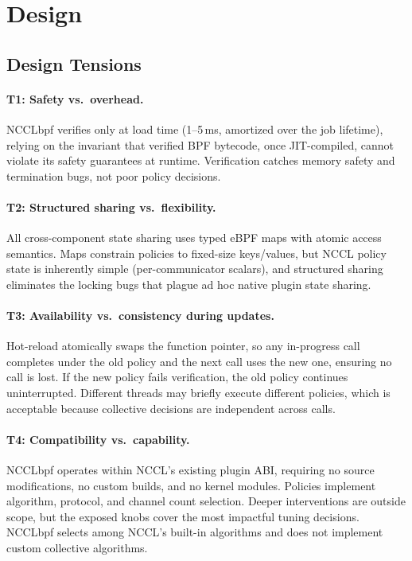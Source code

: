 \documentclass[sigplan,10pt]{acmart}
\newcommand{\sysname}{NCCLbpf\xspace}
\begin{document}
\section{Design}
\label{sec:design}

\subsection{Design Tensions}

\paragraph{T1: Safety vs.\ overhead.}
\sysname verifies only at load time (1--5\,ms, amortized over the job
lifetime), relying on the invariant that verified BPF bytecode, once
JIT-compiled, cannot violate its safety guarantees at runtime.
Verification catches memory safety and termination bugs, not
poor policy decisions.

\paragraph{T2: Structured sharing vs.\ flexibility.}
All cross-component state sharing uses typed eBPF maps with atomic
access semantics. Maps constrain policies to fixed-size keys/values,
but NCCL policy state is inherently simple (per-communicator scalars),
and structured sharing eliminates the locking bugs that plague ad hoc
native plugin state sharing.

\paragraph{T3: Availability vs.\ consistency during updates.}
Hot-reload atomically swaps the function pointer, so any in-progress call
completes under the old policy and the next call uses the new one, ensuring
no call is lost. If the new policy fails verification, the old policy
continues uninterrupted. Different threads may briefly execute
different policies, which is acceptable because collective decisions
are independent across calls.

\paragraph{T4: Compatibility vs.\ capability.}
\sysname operates within NCCL's existing plugin ABI, requiring
no source modifications, no custom builds, and no kernel modules.
Policies implement algorithm, protocol, and channel count selection. Deeper interventions are outside scope, but
the exposed knobs cover the most impactful tuning decisions.
\sysname selects among NCCL's built-in algorithms and does not
implement custom collective algorithms.
\end{document}
